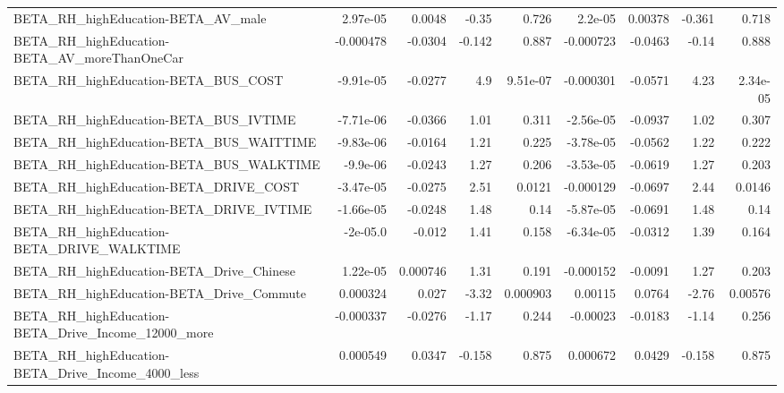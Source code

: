 \begin{tabular}{lrrrrrrrr}
BETA\_RH\_highEducation-BETA\_AV\_male                 &    2.97e-05 &       0.0048 &    -0.35 &    0.726 &    2.2e-05 &     0.00378 &       -0.361 &         0.718 \\
BETA\_RH\_highEducation-BETA\_AV\_moreThanOneCar       &   -0.000478 &      -0.0304 &   -0.142 &    0.887 &  -0.000723 &     -0.0463 &        -0.14 &         0.888 \\
BETA\_RH\_highEducation-BETA\_BUS\_COST                &   -9.91e-05 &      -0.0277 &      4.9 & 9.51e-07 &  -0.000301 &     -0.0571 &         4.23 &      2.34e-05 \\
BETA\_RH\_highEducation-BETA\_BUS\_IVTIME              &   -7.71e-06 &      -0.0366 &     1.01 &    0.311 &  -2.56e-05 &     -0.0937 &         1.02 &         0.307 \\
BETA\_RH\_highEducation-BETA\_BUS\_WAITTIME            &   -9.83e-06 &      -0.0164 &     1.21 &    0.225 &  -3.78e-05 &     -0.0562 &         1.22 &         0.222 \\
BETA\_RH\_highEducation-BETA\_BUS\_WALKTIME            &    -9.9e-06 &      -0.0243 &     1.27 &    0.206 &  -3.53e-05 &     -0.0619 &         1.27 &         0.203 \\
BETA\_RH\_highEducation-BETA\_DRIVE\_COST              &   -3.47e-05 &      -0.0275 &     2.51 &   0.0121 &  -0.000129 &     -0.0697 &         2.44 &        0.0146 \\
BETA\_RH\_highEducation-BETA\_DRIVE\_IVTIME            &   -1.66e-05 &      -0.0248 &     1.48 &     0.14 &  -5.87e-05 &     -0.0691 &         1.48 &          0.14 \\
BETA\_RH\_highEducation-BETA\_DRIVE\_WALKTIME          &    -2e-05.0 &       -0.012 &     1.41 &    0.158 &  -6.34e-05 &     -0.0312 &         1.39 &         0.164 \\
BETA\_RH\_highEducation-BETA\_Drive\_Chinese           &    1.22e-05 &     0.000746 &     1.31 &    0.191 &  -0.000152 &     -0.0091 &         1.27 &         0.203 \\
BETA\_RH\_highEducation-BETA\_Drive\_Commute           &    0.000324 &        0.027 &    -3.32 & 0.000903 &    0.00115 &      0.0764 &        -2.76 &       0.00576 \\
BETA\_RH\_highEducation-BETA\_Drive\_Income\_12000\_more &   -0.000337 &      -0.0276 &    -1.17 &    0.244 &   -0.00023 &     -0.0183 &        -1.14 &         0.256 \\
BETA\_RH\_highEducation-BETA\_Drive\_Income\_4000\_less  &    0.000549 &       0.0347 &   -0.158 &    0.875 &   0.000672 &      0.0429 &       -0.158 &         0.875 \\

\end{tabular}
